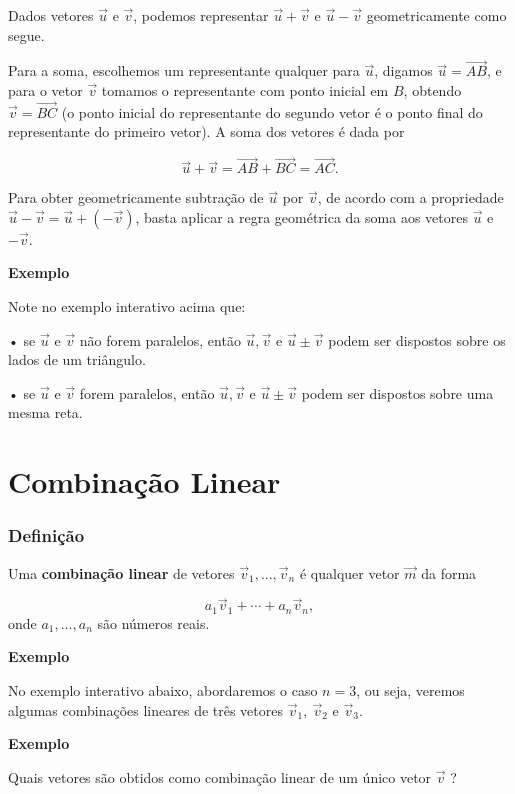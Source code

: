 \documentclass[
  brazilian,
  letterpaper,
  DIV=11,
  numbers=noendperiod]{scrreprt}
\theoremstyle{definition}
\theoremstyle{plain}
\theoremstyle{definition}
\theoremstyle{remark}
\begin{document}
Dados vetores \(\vec{u}\) e \(\vec{v}\), podemos representar
\(\vec{u}+\vec{v}\) e \(\vec{u}-\vec{v}\) geometricamente como segue.

Para a soma, escolhemos um representante qualquer para \(\vec{u}\),
digamos \(\vec{u}=\vec{AB}\), e para o vetor \(\vec{v}\) tomamos o
representante com ponto inicial em \(B\), obtendo \(\vec{v}=\vec{BC}\)
(o ponto inicial do representante do segundo vetor é o ponto final do
representante do primeiro vetor). A soma dos vetores é dada por

\[
 \vec{u}+\vec{v}=\vec{AB}+\vec{BC}=\vec{AC}.
\]

Para obter geometricamente subtração de \(\vec{u}\) por \(\vec{v}\), de
acordo com a propriedade \(\vec{u}-\vec{v}=\vec{u}+(-\vec{v})\), basta
aplicar a regra geométrica da soma aos vetores \(\vec{u}\) e
\(-\vec{v}\).

\textbf{Exemplo}

Note no exemplo interativo acima que:

• se \(\vec{u}\) e \(\vec{v}\) não forem paralelos, então
\(\vec{u},\vec{v}\) e \(\vec{u}\pm\vec{v}\) podem ser dispostos sobre os
lados de um triângulo.

• se \(\vec{u}\) e \(\vec{v}\) forem paralelos, então
\(\vec{u},\vec{v}\) e \(\vec{u}\pm\vec{v}\) podem ser dispostos sobre
uma mesma reta.


\chapter{Combinação Linear}\label{combinauxe7uxe3o-linear}

\subsection{Definição}\label{definiuxe7uxe3o-6}

Uma \textbf{combinação linear} de vetores \(\vec{v}_1, \dots,\vec{v}_n\)
é qualquer vetor \(\vec{m}\) da forma

\[
a_1\vec{v}_1 +  \cdots + a_n\vec{v}_n, 
\] onde \(a_1, \dots, a_n\) são números reais.

\textbf{Exemplo}

No exemplo interativo abaixo, abordaremos o caso \(n=3\), ou seja,
veremos algumas combinações lineares de três vetores
\(\vec{v}_1, \ \vec{v}_2\) e \(\vec{v}_3\).

\textbf{Exemplo}

Quais vetores são obtidos como combinação linear de um único vetor
\(\vec{v}\) ?
\end{document}
